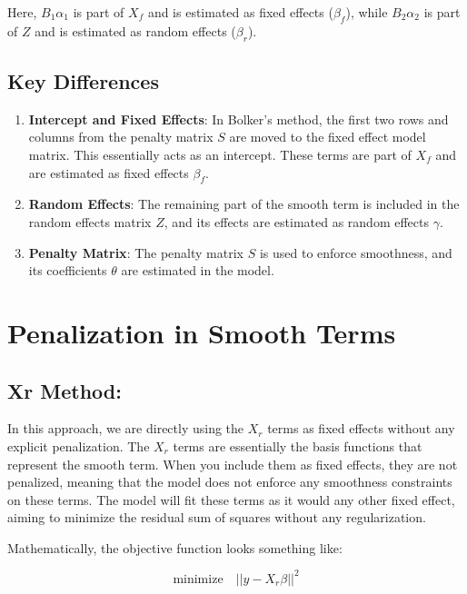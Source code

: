 \documentclass[12pt, twoside,hidelinks]{article}
\theoremstyle{definition}
\numberwithin{equation}{section}
\begin{document}
Here, \(B_1 \alpha_1\) is part of \(X_f\) and is estimated as fixed effects (\(\beta_f\)), while \(B_2 \alpha_2\) is part of \(Z\) and is estimated as random effects (\(\beta_r\)).


\subsection{Key Differences}

\begin{enumerate}
    \item \textbf{Intercept and Fixed Effects}: In Bolker's method, the first two rows and columns from the penalty matrix \(S\) are moved to the fixed effect model matrix. This essentially acts as an intercept. These terms are part of \(X_f\) and are estimated as fixed effects \(\beta_f\).
    
    \item \textbf{Random Effects}: The remaining part of the smooth term is included in the random effects matrix \(Z\), and its effects are estimated as random effects \(\gamma\).
    
    \item \textbf{Penalty Matrix}: The penalty matrix \(S\) is used to enforce smoothness, and its coefficients \(\theta\) are estimated in the model.
\end{enumerate}


\section{Penalization in Smooth Terms}

\subsection{Xr Method:}

In this approach, we are directly using the \(X_r\) terms as fixed effects without any explicit penalization. The \(X_r\) terms are essentially the basis functions that represent the smooth term. When you include them as fixed effects, they are not penalized, meaning that the model does not enforce any smoothness constraints on these terms. The model will fit these terms as it would any other fixed effect, aiming to minimize the residual sum of squares without any regularization.

Mathematically, the objective function looks something like:

\begin{equation}
\text{minimize} \quad ||y - X_r \beta||^2
\end{equation}
\end{document}
